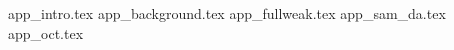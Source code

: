 \documentclass[
    10pt,
	colorful,
	boxey,
 a4paper,
]{tufte-style-thesis}
\begin{document}
\setcounter{table}{0}
\setcounter{figure}{0}
\setcounter{section}{0}

\renewcommand{\thetable}{A\arabic{table}}  %
\renewcommand{\thefigure}{A\arabic{figure}}  %
\renewcommand{\thechapter}{\Alph{chapter}}
\renewcommand{\thesection}{\Alph{section}}

{app_intro.tex}
\newpage
{app_background.tex}
\newpage
{app_fullweak.tex}
\newpage
{app_sam_da.tex}
\newpage
{app_oct.tex}

\cleardoublepage


\begin{wide}
\thispagestyle{empty}
\printindex
\end{wide}
\end{document}
